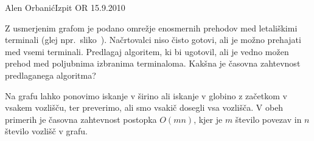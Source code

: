 \begin{naloga}{Alen Orbanić}{Izpit OR 15.9.2010}
\begin{vprasanje}
Z usmerjenim grafom je podano omrežje enosmernih prehodov
med letališkimi terminali (glej npr.~sliko~\fig[terminali]).
Načrtovalci niso čisto gotovi, ali je možno prehajati med vsemi terminali.
Predlagaj algoritem, ki bi ugotovil,
ali je vedno možen prehod med poljubnima izbranima terminaloma.
Kakšna je časovna zahtevnost predlaganega algoritma?

\end{vprasanje}

\begin{odgovor}
Na grafu lahko ponovimo iskanje v širino ali iskanje v globino
z začetkom v vsakem vozlišču,
ter preverimo, ali smo vsakič dosegli vsa vozlišča.
V obeh primerih je časovna zahtevnost postopka $O(mn)$,
kjer je $m$ število povezav in $n$ število vozlišč v grafu.
\end{odgovor}
\end{naloga}
